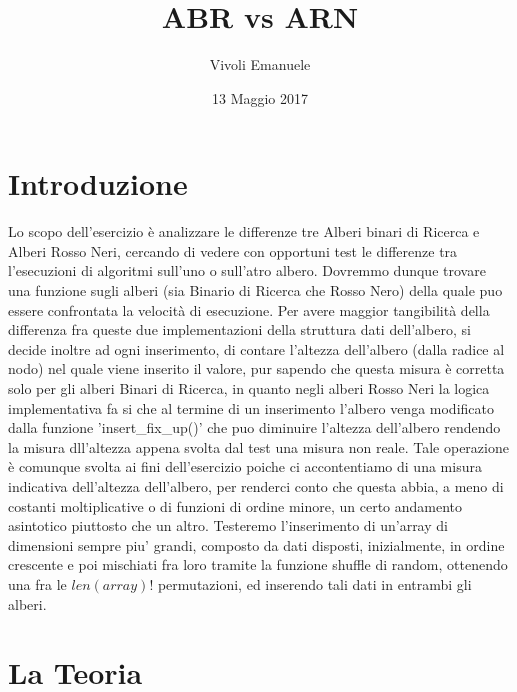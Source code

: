 \documentclass{article}
\title{ABR vs ARN}
\author{Vivoli Emanuele }
\date{13 Maggio 2017}
\makeatletter
\renewcommand\tableofcontents{%
    \@starttoc{toc}%
}
\makeatother
\begin{document}
\maketitle
\vspace*{0.30\textheight}
\tableofcontents

\newpage
\section{Introduzione}
Lo scopo dell'esercizio è analizzare le differenze tre Alberi binari di Ricerca e Alberi Rosso Neri, cercando di vedere con opportuni test le differenze tra l'esecuzioni di algoritmi sull'uno o sull'atro albero. 
Dovremmo dunque trovare una funzione sugli alberi (sia Binario di Ricerca che Rosso Nero) della quale puo essere confrontata la velocità di esecuzione.
Per avere maggior tangibilità della differenza fra queste due implementazioni della struttura dati dell'albero, si decide inoltre ad ogni inserimento, di contare l'altezza dell'albero (dalla radice al nodo) nel quale viene inserito il valore, pur sapendo che questa misura è corretta solo per gli alberi Binari di Ricerca, in quanto negli alberi Rosso Neri la logica implementativa fa si che al termine di un inserimento l'albero venga modificato dalla funzione 'insert\_fix\_up()' che puo diminuire l'altezza dell'albero rendendo la misura dll'altezza appena svolta dal test una misura non reale. Tale operazione è comunque svolta ai fini dell'esercizio poiche ci accontentiamo di una misura indicativa dell'altezza dell'albero, per renderci conto che questa abbia, a meno di costanti moltiplicative o di funzioni di ordine minore, un certo andamento asintotico piuttosto che un altro.
Testeremo l'inserimento di un'array di dimensioni sempre piu' grandi, composto da dati disposti, inizialmente, in ordine crescente e poi mischiati fra loro tramite la funzione shuffle di random, ottenendo una fra le $len(array)!$ permutazioni, ed inserendo tali dati in entrambi gli alberi.

\newpage
\section{La Teoria}
\end{document}
